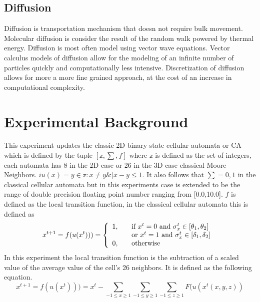 \documentclass[11pt,twocolumn]{article}
\begin{document}
 \subsection{Diffusion}
 Diffusion is transportation mechanism that doesn not require bulk movement. 
 Molecular diffusion is consider the result of the random walk powered by thermal energy. \cite{appert}
 Diffusion is most often model using vector wave equations. Vector calculus models of diffusion allow for the modeling of an infinite number of particles quickly and computationally less intensive.\cite{Tomas1} 
 Discretization of diffusion allows for more a more fine grained approach, at the cost of an increase in computational complexity.\cite{newman99}
\section{Experimental Background}
This experiment updates the classic 2D binary state cellular automata or CA which is defined by 
the tuple $[ \mathbb{z},\sum,f ]$ where $\mathbb{z}$ is defined as the set of integers, 
each automata has 8 in the 2D case or 26 in the 3D case classical Moore Neighbors. 
$i u(x)={y \in \mathbb{z}: x \ne y \& |x-y \leq 1} $. It also follows that $\sum ={0,1}$ in the classical cellular automata but in this experiments case is extended to be the range of double precision floating point number ranging from [0.0,10.0]. $f$ is defined as the local transition function, in the classical cellular automata this is defined as\cite{watts99}\cite{watts98}
\begin{equation}
x^{t+1}=f(u(x^{t}))) = \left\{ 
  \begin{array}{l l}
    1, & \quad \textrm{if $x^{t} =0$ and $\sigma_{x}^{t} \in [\theta_{1},\theta_{2}]$ }\\
       & \quad \textrm{or $x^{t} = 1$ and $\sigma^{t}_{x} \in [\delta_{1},\delta_{2}]$ }\\
    0, & \quad \textrm{otherwise} \\
  \end{array} \right.
\end{equation}  
In this experiment the local transition function is the subtraction of a scaled value of the average value of the 
cell's 26 neighbors. It is defined as the following equation.
\begin{equation} 
x^{t+1}=f(u(x^{t}))) = x^{t} - \sum_{-1 \leq x \geq 1} \sum_{-1 \leq y \geq 1} \sum_{-1 \leq z \geq 1} F(u(x^{t}(x,y,z))
\end{equation} 
\end{document}
